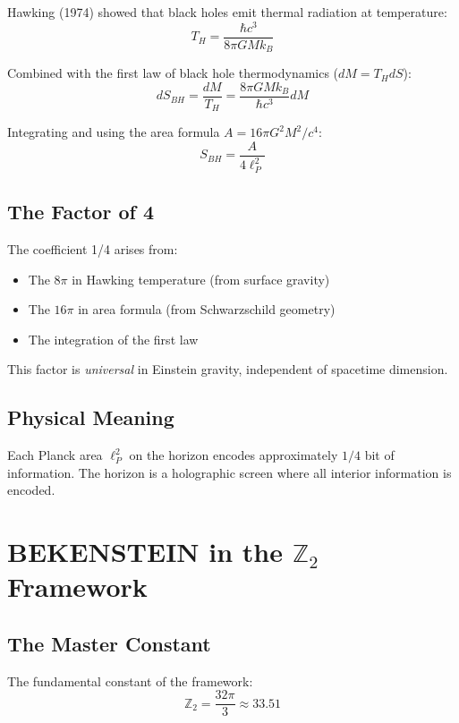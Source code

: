 \documentclass[12pt,a4paper]{article}
\begin{document}
Hawking (1974) showed that black holes emit thermal radiation at temperature:
\begin{equation}
T_H = \frac{\hbar c^3}{8\pi GM k_B}
\end{equation}

Combined with the first law of black hole thermodynamics ($dM = T_H dS$):
\begin{equation}
dS_{BH} = \frac{dM}{T_H} = \frac{8\pi GM k_B}{\hbar c^3} dM
\end{equation}

Integrating and using the area formula $A = 16\pi G^2 M^2/c^4$:
\begin{equation}
S_{BH} = \frac{A}{4\ell_P^2}
\end{equation}

\subsection{The Factor of 4}

The coefficient 1/4 arises from:
\begin{itemize}
    \item The $8\pi$ in Hawking temperature (from surface gravity)
    \item The $16\pi$ in area formula (from Schwarzschild geometry)
    \item The integration of the first law
\end{itemize}

This factor is \textit{universal} in Einstein gravity, independent of spacetime dimension.

\subsection{Physical Meaning}

Each Planck area $\ell_P^2$ on the horizon encodes approximately $1/4$ bit of information. The horizon is a holographic screen where all interior information is encoded.

\section{BEKENSTEIN in the $\mathbb{Z}_2$ Framework}

\subsection{The Master Constant}

The fundamental constant of the framework:
\begin{equation}
\mathbb{Z}_2 = \frac{32\pi}{3} \approx 33.51
\end{equation}
\end{document}
